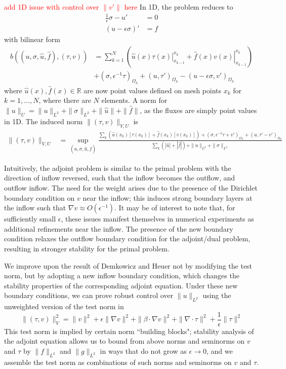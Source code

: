 \documentclass[11pt,onecolumn]{scrartcl}
\newcommand{\grad}{\nabla}
\renewcommand{\div}{\grad \cdot}
\begin{document}
\textcolor{red}{add 1D issue with control over $\|v'\|$ here}
In 1D, the problem reduces to 
\begin{align*}
\frac{1}{\epsilon}\sigma - u' &= 0\\
\left(u - \epsilon \sigma \right)' &=f
\end{align*}
with bilinear form
\begin{align*}
b\left(\left(u,\sigma,\widehat{u},\widehat{f}\right),\left(\tau,v\right)\right) &= \sum_{k=1}^N \left(\left.\widehat{u}(x) \tau(x)\right |^{x_k}_{x_{k-1}} + \left.\widehat{f}(x) v(x)\right |^{x_k}_{x_{k-1}}\right) \\
&+ \left(\sigma,\epsilon^{-1}\tau\right)_{\Omega_h} + (u,\tau')_{\Omega_h}- \left(u - \epsilon \sigma,v'\right)_{\Omega_h}
\end{align*}
where $\widehat{u}(x), \widehat{f}(x) \in \mathbb{R}$ are now point values defined on mesh points $x_k$ for $k=1,\ldots,N$, where there are $N$ elements.
A norm for $\|u\|_U = \|u\|_{L^2} + \|\sigma\|_{L^2} + \|\widehat{u}\|+ \|\widehat{f}\|$, as the fluxes are simply point values in 1D.  
The induced norm $\|\left(\tau,v\right)\|_{V,U}$ is
\begin{align*}
\|\left(\tau,v\right)\|_{V,U} &= \sup_{\left(u,\sigma,\widehat{u},\widehat{f}\right)} \frac{ \sum_k \left(\widehat{u}(x_k) [\tau(x_k)] + \widehat{f}(x_k) [v(x_k)]\right)+ \left(\sigma,\epsilon^{-1}\tau + v'\right)_{\Omega_h} + (u,\tau'-v')_{\Omega_h}}{\sum_k \left(|\widehat{u}|+ |\widehat{f}|\right) + \|u\|_{L^2} + \|\sigma\|_{L^2} }
\end{align*}



Intuitively, the adjoint problem is similar to the primal problem with the direction of inflow reversed, such that the inflow becomes the outflow, and outflow inflow.  The need for the weight arises due to the presence of the Dirichlet boundary condition on $v$ near the inflow; this induces strong boundary layers at the inflow such that $\grad v \approx O(\epsilon^{-1})$. It may be of interest to note that, for sufficiently small $\epsilon$, these issues manifest themselves in numerical experiments as additional refinements near the inflow.  The presence of the new boundary condition relaxes the outflow boundary condition for the adjoint/dual problem, resulting in stronger stability for the primal problem.  

We improve upon the result of Demkowicz and Heuer not by modifying the test norm, but by adopting a new inflow boundary condition, which changes the stability properties of the corresponding adjoint equation. Under these new boundary conditions, we can prove robust control over $\|u\|_{L^2}$ using the unweighted version of the test norm in \cite{DPGrobustness}
\[
\|\left(\tau, v\right)\|_{V}^2 = \|v\|^2 + \epsilon \|\grad v\|^2 + \|\beta \cdot \grad v\|^2 + \| \div \tau\|^2 + \frac{1}{\epsilon}\|\tau\|^2
\]
This test norm is implied by certain norm ``building blocks"; stability analysis of the adjoint equation allows us to bound from above norms and seminorms on $v$ and $\tau$ by $\|f\|_{L^2}$ and $\|g\|_{L^2}$ in ways that do not grow as $\epsilon \rightarrow 0$, and we assemble the test norm as combinations of such norms and seminorms on $v$ and $\tau$.  
\end{document}
